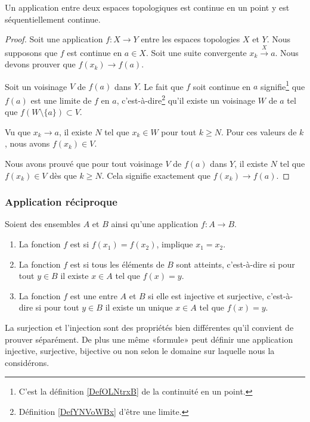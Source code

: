 \begin{corollary}		\label{PropFnContParSuite}
    Un application entre deux espaces topologiques est continue en un point y est séquentiellement continue.
\end{corollary}

\begin{proof}
    Soit une application \( f\colon X\to Y\) entre les espaces topologies \( X\) et \( Y\). Nous supposons que \( f\) est continue en \( a\in X\). Soit une suite convergente \( x_k\stackrel{X}{\longrightarrow}a\). Nous devons prouver que \( f(x_k)\to f(a)\).

    Soit un voisinage \( V\) de \( f(a)\) dans \( Y\). Le fait que \( f\) soit continue en \( a\) signifie\footnote{C'est la définition \ref{DefOLNtrxB} de la continuité en un point.} que \( f(a)\) est une limite de \( f\) en \( a\), c'est-à-dire\footnote{Définition \ref{DefYNVoWBx} d'être une limite.} qu'il existe un voisinage \( W\) de \( a\) tel que \( f(W\setminus\{ a \})\subset V\).

    Vu que \( x_k\to a\), il existe \( N\) tel que \( x_k\in W\) pour tout \( k\geq N\). Pour ces valeurs de \( k\), nous avons \( f(x_k)\in V\).

    Nous avons prouvé que pour tout voisinage \( V\) de \( f(a)\) dans \( Y\), il existe \( N\) tel que \( f(x_k)\in V\) dès que \( k\geq N\). Cela signifie exactement que \( f(x_k)\to f(a)\).
\end{proof}


\subsubsection{Application réciproque}

\begin{definition}        \label{DEFooBFCQooPyKvRK}
    Soient des ensembles \( A\) et \( B\) ainsi qu'une application \( f\colon A\to B\).
    \begin{enumerate}
        \item
            La fonction \( f\) est  si \( f(x_1)=f(x_2)\), implique \( x_1=x_2\).
        \item
            La fonction \( f\) est  si tous les éléments de \( B\) sont atteints, c'est-à-dire si pour tout \( y\in B\) il existe \( x\in A\) tel que \( f(x)=y\).
        \item
            La fonction \( f\) est une  entre \( A\) et \( B\) si elle est injective et surjective, c'est-à-dire si pour tout \( y\in B\) il existe un unique \( x\in A\) tel que \( f(x)=y\).
    \end{enumerate}
\end{definition}
La surjection et l'injection sont des propriétés bien différentes qu'il convient de prouver séparément. De plus une même «formule» peut définir une application injective, surjective, bijective ou non selon le domaine sur laquelle nous la considérons.

